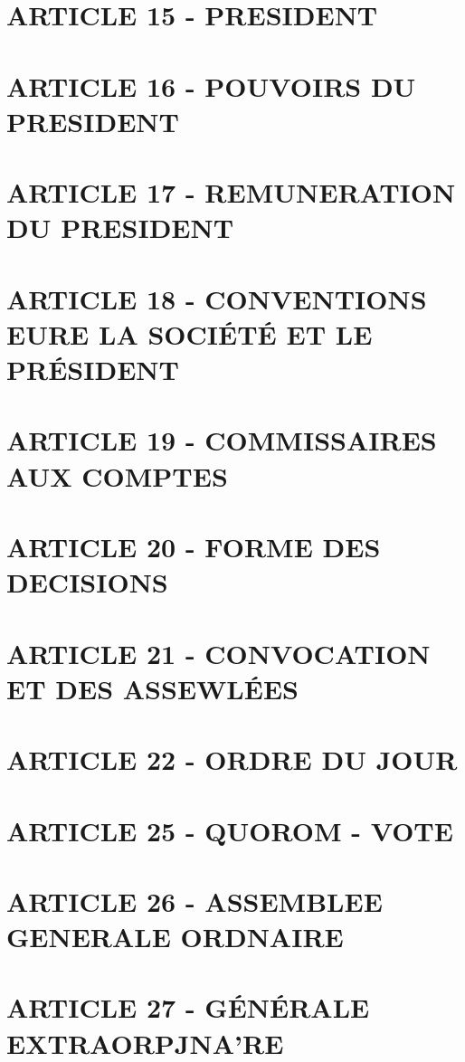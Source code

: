 \documentclass[a4paper, 11pt]{article}
\begin{document}
\section*{ARTICLE 15 - PRESIDENT}

\section*{ARTICLE 16 - POUVOIRS DU PRESIDENT}

\section*{ARTICLE 17 - REMUNERATION DU PRESIDENT}

\section*{ARTICLE 18 - CONVENTIONS EURE LA SOCIÉTÉ ET LE PRÉSIDENT}

\section*{ARTICLE 19 - COMMISSAIRES AUX COMPTES}

\section*{ARTICLE 20 - FORME DES DECISIONS}

\section*{ARTICLE 21 - CONVOCATION ET DES ASSEWLÉES}

\section*{ARTICLE 22 - ORDRE DU JOUR}

\section*{ARTICLE 25 - QUOROM - VOTE}

\section*{ARTICLE 26 - ASSEMBLEE GENERALE ORDNAIRE}

\section*{ARTICLE 27 - GÉNÉRALE EXTRAORPJNA'RE}
\end{document}
